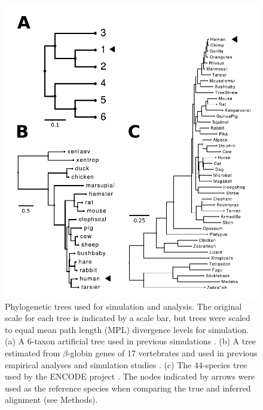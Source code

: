 \documentclass{article}
\begin{document}
\begin{figure}[t]
\begin{center}
\includegraphics[scale=0.8]{fig1.pdf}
\end{center}
\caption{Phylogenetic trees used for simulation and analysis. The
  original scale for each tree is indicated by a scale bar, but trees
  were scaled to equal mean path length (MPL) divergence levels for
  simulation. (a) A 6-taxon artificial tree used in previous
  simulations
  \citep{Anisimova2001Accuracy,Massingham2005Detecting}. (b) A tree
  estimated from $\beta$-globin genes of 17 vertebrates and used in
  previous empirical analyses and simulation studies
  \citep{Anisimova2001Accuracy,Anisimova2002Accuracy}. (c) The
  44-species tree used by the ENCODE project
  \citep{2007Identification,Nikolaev2007Early}. The nodes indicated by
  arrows were used as the reference species when comparing the true
  and inferred alignment (see Methods).}
\label{fig_1}
\end{figure}
\end{document}
